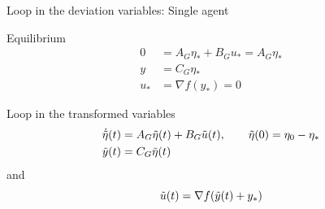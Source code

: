 \documentclass{beamer}
\begin{document}
\begin{frame}{Loop in the deviation variables: Single agent}
	\begin{block}{Equilibrium}
		\begin{equation} \label{eq:sys_dyn_G_delta}
			\begin{split}
				0&=A_G\eta_* + B_G u_*=A_G\eta_*\\
				y&=C_G \eta_*\\
				u_*&=\nabla f(y_*)=0
			\end{split}
		\end{equation}
	\end{block}
	\begin{block}{Loop in the transformed variables}
		\begin{equation} \label{eq:sys_dyn_G_tilde}
			\begin{split}
				\Dot{\Tilde{\eta}}(t)&=A_G\Tilde{\eta}(t) + B_G \Tilde{u}(t), \quad \quad \Tilde{\eta}(0)=\eta_0-\eta_*\\
				\Tilde{y}(t)&=C_G \Tilde{\eta}(t)
			\end{split}
		\end{equation}
		and 
		\begin{equation} \label{eq:delta}
			\Tilde{u}(t)=\nabla f(\Tilde{y}(t)+y_*)
		\end{equation}
	\end{block}
\end{frame}
\end{document}
